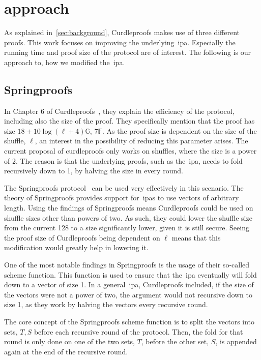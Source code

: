 \section{approach}\label{sec:approach}

As explained in~\autoref{sec:background}, Curdleproofs makes use of three different proofs.
This work focuses on improving the underlying~\gls{ipa}.
Especially the running time and proof size of the protocol are of interest.
The following is our approach to, how we modified the~\gls{ipa}.

\subsection{Springproofs}\label{sec:approach-springproofs}
In Chapter 6 of Curdleproofs~\cite{Curdleproofs}, they explain the efficiency of the protocol, including also the size of the proof.
They specifically mention that the proof has size $18+10 \log(\ell+4)\mathbb{G}$, $7\mathbb{F}$.
As the proof size is dependent on the size of the shuffle, $\ell$, an interest in the possibility of reducing this parameter arises.
The current proposal of curdleproofs only works on shuffles, where the size is a power of 2.
The reason is that the underlying proofs, such as the~\gls{ipa}, needs to fold recursively down to 1, by halving the size in every round.

The Springproofs protocol~\cite{zhang2024springproofs} can be used very effectively in this scenario.
The theory of Springproofs provides support for~\glspl{ipa} to use vectors of arbitrary length.
Using the findings of Springproofs means Curdleproofs could be used on shuffle sizes other than powers of two.
As such, they could lower the shuffle size from the current 128 to a size significantly lower, given it is still secure.
Seeing the proof size of Curdleproofs being dependent on $\ell$ means that this modification would greatly help in lowering it.

One of the most notable findings in Springproofs is the usage of their so-called scheme function.
This function is used to ensure that the~\gls{ipa} eventually will fold down to a vector of size 1.
In a general~\gls{ipa}, Curdleproofs included, if the size of the vectors were not a power of two, the argument would not recursive down to size 1, as they work by halving the vectors every recursive round.


The core concept of the Springproofs scheme function is to split the vectors into sets, $T,S$ before each recursive round of the protocol.
Then, the fold for that round is only done on one of the two sets, $T$, before the other set, $S$, is appended again at the end of the recursive round.

